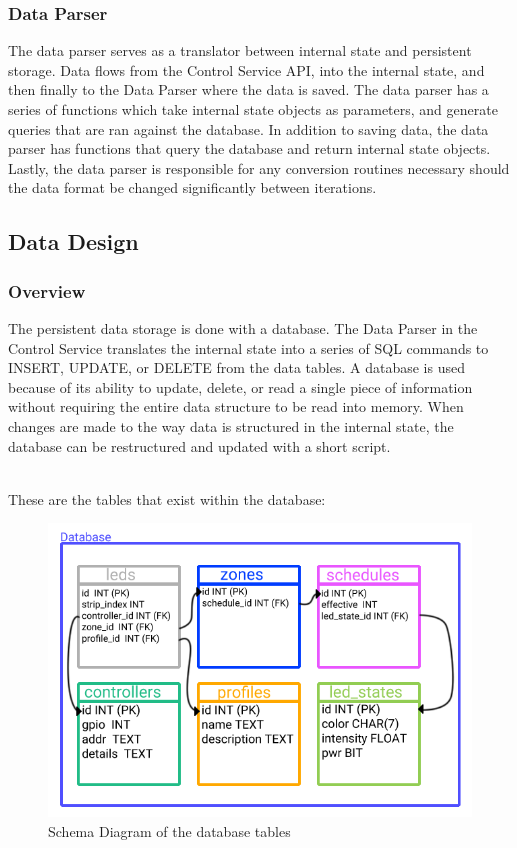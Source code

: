 			\subsubsection{Data Parser}
			The data parser serves as a translator between internal state and persistent storage.
			Data flows from the Control Service API, into the internal state, and then finally to the Data Parser where the data is saved.
			The data parser has a series of functions which take internal state objects as parameters, and generate queries that are ran against the database.
			In addition to saving data, the data parser has functions that query the database and return internal state objects.
			Lastly, the data parser is responsible for any conversion routines necessary should the data format be changed significantly between iterations.


		\subsection{Data Design}
			\subsubsection{Overview}
			The persistent data storage is done with a database.
			The Data Parser in the Control Service translates the internal state into a series of SQL commands to INSERT, UPDATE, or DELETE from the data tables.
			A database is used because of its ability to update, delete, or read a single piece of information without requiring the entire data structure to be read into memory.
			When changes are made to the way data is structured in the internal state, the database can be restructured and updated with a short script.

			\noindent \\These are the tables that exist within the database:
			\begin{center}
				\begin{figure}[H]
					\includegraphics[width=\linewidth]{systemDiagrams/database.png}
					\caption{Schema Diagram of the database tables}
					\label{fig:databaseDiagram}
				\end{figure}
			\end{center}

